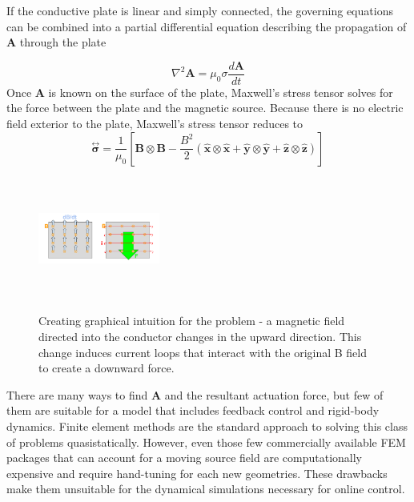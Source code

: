 \documentclass{article}
\begin{document}
If the conductive plate is linear and simply connected, the governing equations can be combined into a partial differential equation describing the propagation of $\textbf{A}$ through the plate \cite{Smyth1989}

\begin{equation}\label{eq:governingPDE}
\nabla^2 \textbf{A} = \mu_0\sigma \frac{d\textbf{A}}{dt}
\end{equation}
Once \textbf{A} is known on the surface of the plate, Maxwell's stress tensor solves for the force between the plate and the magnetic source. Because there is no electric field exterior to the plate, Maxwell's stress tensor reduces to
\begin{equation} \label{eq:stressTensor}
\overset{\leftrightarrow  }{ \mathbf{\sigma} } = \frac{1}{\mu_0} \left[ \mathbf{B}\otimes\mathbf{B} - \frac{B^2 }{2} (\mathbf{\hat x}\otimes\mathbf{\hat x} + \mathbf{\hat y}\otimes\mathbf{\hat y} + \mathbf{\hat z}\otimes\mathbf{\hat z}) \right]
\end{equation}



\begin{figure}
\includegraphics[width = 4cm, height = 4cm ]{figures/Eddy-Current-Force.png}
\label{fig:force_generation}
\caption{Creating graphical intuition for the problem - a magnetic field directed into the conductor changes in the upward direction. This change induces current loops that interact with the original B field to create a downward force.}
\end{figure}

There are many ways to find \textbf{A} and the resultant actuation force, but few of them are suitable for a model that includes feedback control and rigid-body dynamics. \cite{Paudel2013}
Finite element methods are the standard approach to solving this class of problems quasistatically. However, even those few commercially available FEM packages that can account for a moving source field are computationally expensive and require hand-tuning for each new geometries. These drawbacks make them unsuitable for the dynamical simulations necessary for online control. 
\end{document}

